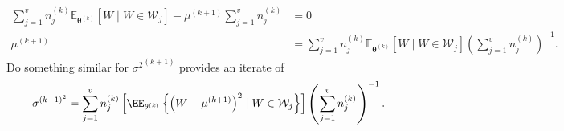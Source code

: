 \begin{exam}
\begin{align*}
        \sum_{j=1}^{v} n_{j}^{(k)} \mathbb{E}_{\bm{\theta}^{(k)}} \left[ W \mid W \in \mathcal{W}_{j} \right] - \mu^{(k+1)} \sum_{j=1}^{v} n_{j}^{(k)}           & = 0                                                                                                                                                     \\
        \mu^{(k+1)}                                                                                                                                              & = \sum_{j=1}^{v} n_{j}^{(k)} \mathbb{E}_{\bm{\theta}^{(k)}} \left[ W \mid W \in \mathcal{W}_{j} \right] \left( \sum_{j=1}^{v} n_{j}^{(k)} \right)^{-1}.
    \end{align*}
    Do something similar for ${\sigma^{2}}^{(k+1)}$ provides an iterate of
    \begin{equation*}
        \sigma^{(k+1)^{2}}=\sum_{j=1}^{v} n_{j}^{(k)}\left[\EE_{\theta^{(k)}}\left\{\left(W-\mu^{(k+1)}\right)^{2} \mid W \in \mathcal{W}_{j}\right\}\right] \left( \sum_{j=1}^{v} n_{j}^{(k)} \right)^{-1}.
    \end{equation*}
\end{exam}